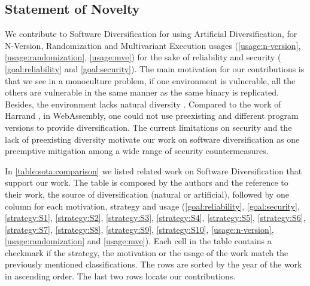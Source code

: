 \subsection*{Statement of Novelty}



We contribute to Software Diversification for \wasm using Artificial Diversification, for N-Version, Randomization and Multivariant Execution usages (\autoref{usage:n-version}, \autoref{usage:randomization}, \autoref{usage:mve}) for the sake of reliability and security ( \autoref{goal:reliability} and \autoref{goal:security}). 
The main motivation for our contributions is that we see in \wasm a monoculture problem, if one environment is vulnerable, all the others are vulnerable in the same manner as the same \wasm binary is replicated. 
Besides, the \wasm environment lacks natural diversity \cite{natural_diversity}. Compared to the work of Harrand \etal \citationneeded, in WebAssembly, one could not use preexisting and different program versions to provide diversification. The current limitations on security and the lack of preexisting diversity motivate our work on software diversification as one preemptive mitigation among a wide range of security countermeasures. 

In \autoref{table:sota:comparison} we listed related work on Software Diversification that support our work. The table is composed by the authors and the reference to their work, the source of diversification (natural or artificial), followed by one column for each motivation, strategy and usage (\autoref{goal:reliability},  \autoref{goal:security},  \autoref{strategy:S1},  \autoref{strategy:S2},  \autoref{strategy:S3},  \autoref{strategy:S4},  \autoref{strategy:S5},  \autoref{strategy:S6},  \autoref{strategy:S7},  \autoref{strategy:S8},  \autoref{strategy:S9}, \autoref{strategy:S10}, \autoref{usage:n-version}, \autoref{usage:randomization} and \autoref{usage:mve}). Each cell in the table contains a checkmark if the strategy, the motivation or the usage of the work match the previously mentioned classifications. The rows are sorted by the year of the work in ascending order. The last two rows locate our contributions. 



